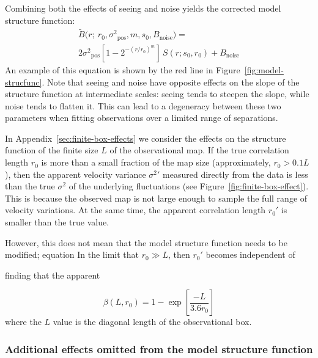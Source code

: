 \documentclass[fleqn,usenatbib, useAMS, a4paper]{mnras}
\newcommand\pos{\ensuremath{_{\mathrm{pos}}}}
\begin{document}
Combining both the effects of seeing and noise yields the corrected
model structure function:
\begin{multline}
  \tilde{B}
  \bigl( r; \ r_0, \sigma^2\pos, m, s_0, B_{\text{noise}} \bigr)
  = \\
  2\sigma^2\pos \left[
    1 - 2^{- \left( r/r_0 \right)^m} 
  \right]
  \,  S(r; s_0, r_0) + B_{\text{noise}}
\label{eq:sf-functional}
\end{multline}
An example of this equation is shown by the red line in Figure~\ref{fig:model-strucfunc}.
Note that seeing and noise have opposite effects on the slope
of the structure function at intermediate scales:
seeing tends to steepen the slope, while noise tends to flatten it.
This can lead to a degeneracy between these two parameters
when fitting observations over a limited range of separations.

In Appendix~\ref{sec:finite-box-effects} we consider the effects
on the structure function of the finite size \(L\) of the observational map.
If the true correlation length \(r_0\) is more than a small fraction of the map size
(approximately, \(r_0 > 0.1 L\)),
then the apparent velocity variance \(\sigma^2'\) measured directly from the data
is less than the true \(\sigma^2\) of the underlying fluctuations
(see Figure~\ref{fig:finite-box-effect}).
This is because the observed map is not large enough to sample
the full range of velocity variations.
At the same time, the apparent correlation length \(r_0'\) is smaller
than the true value.

However, this does not mean that the model structure function needs to be modified;
equation
In the limit that \(r_0 \gg L\), then \(r_0'\) becomes independent of 

finding that the apparent 


\begin{equation}\label{eq:ffb}
  \beta(L,r_0) = 1 - \exp \left[ \frac{-L} {3.6 r_0} \right] 
\end{equation}
%
where the \(L\) value is the diagonal length of the observational box.


\subsubsection{Additional effects omitted from the model structure function}
\label{sec:limit-model-struct}
\end{document}
